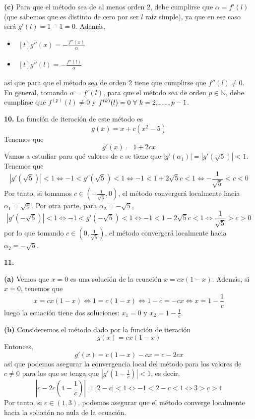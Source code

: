 \documentclass[12pt]{report}
\newcommand{\N}{\mathbb N}
\begin{document}
\vspace{2mm}
\textbf{(c) } Para que el método sea de al menos orden 2, debe cumplirse que $\alpha = f'(l)$ (que sabemos que es distinto de cero por ser $l$ raíz simple), ya que en ese caso será $g'(l) = 1 - 1 = 0$. Además,
\begin{itemize}
    \item
    $
    \begin{aligned}[t]
        g''(x) = -\frac{f''(x)}{\alpha}
    \end{aligned}
    $
    \item
    $
    \begin{aligned}[t]
        g''(l) = -\frac{f''(l)}{\alpha}
    \end{aligned}
    $ 
\end{itemize}
así que para que el método sea de orden 2 tiene que cumplirse que $f''(l) \neq 0$. En general, tomando $\alpha = f'(l)$, para que el método sea de orden $p \in \N$, debe cumplirse que $f^{(p)}(l) \neq 0$ y $f^{(k)}(l) = 0 \ \forall \ k = 2,\mathellipsis,p-1$.

\vspace{6mm}
\textbf{10. } La función de iteración de este método es
\[g(x) = x+c(x^2-5)\]
Tenemos que
\[g'(x) = 1 +2cx\]
Vamos a estudiar para qué valores de $c$ se tiene que $|g'(\alpha_1)| = |g'(\sqrt{5})|< 1$. Tenemos que
\[|g'(\sqrt{5})| < 1 \iff -1<g'(\sqrt{5})<1 \iff -1<1+2\sqrt{5}c<1 \iff -\frac{1}{\sqrt{5}}<c<0\]
Por tanto, si tomamos $c \in (-\frac{1}{\sqrt{5}},0)$, el método convergerá localmente hacia $\alpha_1 = \sqrt{5}$. Por otra parte, para $\alpha_2 = -\sqrt{5}$,
\[|g'(-\sqrt{5})| < 1 \iff -1<g'(-\sqrt{5})<1 \iff -1<1-2\sqrt{5}c<1 \iff \frac{1}{\sqrt{5}}>c>0\]
por lo que tomando $c \in (0,\frac{1}{\sqrt{5}})$, el método convergerá localmente hacia $\alpha_2 = -\sqrt{5}$.

\vspace{6mm}
\textbf{11. }

\vspace{2mm}
\textbf{(a) } Vemos que $x = 0$ es una solución de la ecuación $x = cx(1-x)$. Además, si $x=0$, tenemos que
\[x = cx(1-x) \iff 1 = c(1-x) \iff 1-c=-cx \iff x = 1 - \frac{1}{c}\]
luego la ecuación tiene dos soluciones: $x_1 = 0$ y $x_2 = 1-\frac{1}{c}$.

\vspace{2mm}
\textbf{(b) } Consideremos el método dado por la función de iteración
\[g(x)=cx(1-x)\]
Entonces,
\[g'(x) = c(1-x)-cx = c - 2cx\]
así que podemos asegurar la convergencia local del método para los valores de $c \neq 0$ para los que se tenga que $|g'(1-\frac{1}{c})| < 1$, es decir,
\[|c-2c(1-\frac{1}{c})| = |2-c| < 1 \iff -1 < 2-c < 1 \iff 3 > c > 1\]
Por tanto, si $c \in (1,3)$, podemos asegurar que el método converge localmente hacia la solución no nula de la ecuación.
\end{document}
